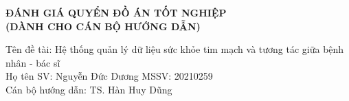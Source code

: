 





\newpage 
\thispagestyle{empty}
\begin{center}
    \textbf{\fontsize{14pt}{0pt}\selectfont ĐÁNH GIÁ QUYỂN ĐỒ ÁN TỐT NGHIỆP}\\
    \vspace{-3pt}
    \textbf{\fontsize{13pt}{0pt}\selectfont (DÀNH CHO CÁN BỘ HƯỚNG DẪN) }
\end{center}
\vspace{-5pt}
\fontsize{12pt}{20pt}\selectfont Tên đề tài: Hệ thống quản lý dữ liệu sức khỏe tim mạch và tương tác giữa bệnh nhân - bác sĩ \\
\fontsize{12pt}{20pt}\selectfont Họ tên SV: Nguyễn Đức Dương
\hspace{3.5cm} 
\fontsize{12pt}{20pt}\selectfont  MSSV: 20210259 \\
\fontsize{12pt}{20pt}\selectfont Cán bộ hướng dẫn: TS. Hàn Huy Dũng \\

\vspace{-4pt}

